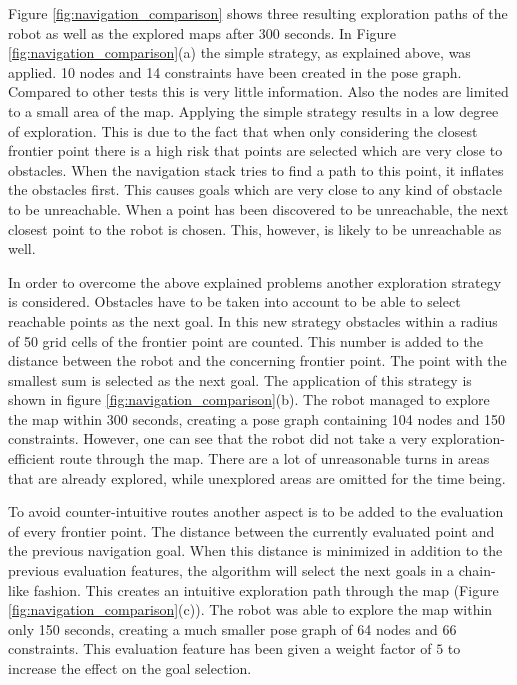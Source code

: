 \documentclass{ba-kecs}
\begin{document}
Figure \ref{fig:navigation_comparison} shows three resulting exploration paths of the robot as well as the explored maps after 300 seconds. In Figure \ref{fig:navigation_comparison}(a) the simple strategy, as explained above, was applied. 10 nodes and 14 constraints have been created in the pose graph. Compared to other tests this is very little information. Also the nodes are limited to a small area of the map. Applying the simple strategy results in a low degree of exploration. This is due to the fact that when only considering the closest frontier point there is a high risk that points are selected which are very close to obstacles. When the navigation stack tries to find a path to this point, it inflates the obstacles first. This causes goals which are very close to any kind of obstacle to be unreachable. When a point has been discovered to be unreachable, the next closest point to the robot is chosen. This, however, is likely to be unreachable as well.

In order to overcome the above explained problems another exploration strategy is considered. Obstacles have to be taken into account to be able to select reachable points as the next goal. In this new strategy obstacles within a radius of 50 grid cells of the frontier point are counted. This number is added to the distance between the robot and the concerning frontier point. The point with the smallest sum is selected as the next goal. The application of this strategy is shown in figure \ref{fig:navigation_comparison}(b). The robot managed to explore the map within 300 seconds, creating a pose graph containing 104 nodes and 150 constraints. However, one can see that the robot did not take a very exploration-efficient route through the map. There are a lot of unreasonable turns in areas that are already explored, while unexplored areas are omitted for the time being.

To avoid counter-intuitive routes another aspect is to be added to the evaluation of every frontier point. The distance between the currently evaluated point and the previous navigation goal. When this distance is minimized in addition to the previous evaluation features, the algorithm will select the next goals in a chain-like fashion. This creates an intuitive exploration path through the map (Figure \ref{fig:navigation_comparison}(c)). The robot was able to explore the map within only 150 seconds, creating a much smaller pose graph of 64 nodes and 66 constraints. This evaluation feature has been given a weight factor of $5$ to increase the effect on the goal selection.
\end{document}
